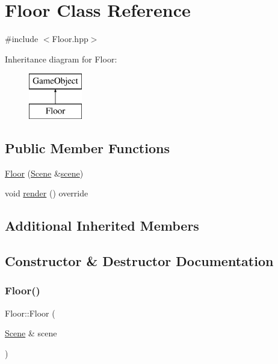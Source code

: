 \hypertarget{class_floor}{}\section{Floor Class Reference}
\label{class_floor}


{\ttfamily \#include $<$Floor.\+hpp$>$}

Inheritance diagram for Floor\+:\begin{figure}[H]
\begin{center}
\leavevmode
\includegraphics[height=2.000000cm]{class_floor}
\end{center}
\end{figure}
\subsection*{Public Member Functions}
\begin{DoxyCompactItemize}
\item 
\mbox{\hyperlink{class_floor_ac3f66e1dc58f13c12d94200bc1d22caa}{Floor}} (\mbox{\hyperlink{class_scene}{Scene}} \&\mbox{\hyperlink{class_game_object_aeea61de934e13603696b4ed00e9fe42e}{scene}})
\item 
void \mbox{\hyperlink{class_floor_a243d39104b6aacb662481be4fda2d72e}{render}} () override
\end{DoxyCompactItemize}
\subsection*{Additional Inherited Members}


\subsection{Constructor \& Destructor Documentation}
\mbox{\label{class_floor_ac3f66e1dc58f13c12d94200bc1d22caa}} 
\subsubsection{\texorpdfstring{Floor()}{Floor()}}
{\footnotesize\ttfamily Floor\+::\+Floor (\begin{DoxyParamCaption}\item[{\mbox{\hyperlink{class_scene}{Scene}} \&}]{scene }\end{DoxyParamCaption})}



